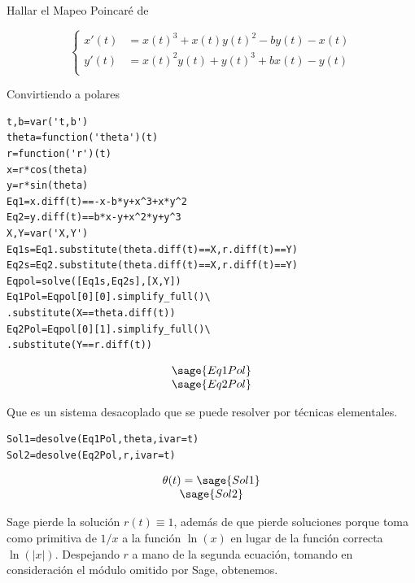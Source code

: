 \begin{ejemplo}{} Hallar el Mapeo Poincaré de

 \[\begin{cases} x'(t)&= x\left(t\right)^{3} + x\left(t\right)
y\left(t\right)^{2} - b y\left(t\right) - x\left(t\right)\\
y'(t) &= x\left(t\right)^{2} y\left(t\right) +
y\left(t\right)^{3} + b x\left(t\right) - y\left(t\right)\\   
  \end{cases}\]


Convirtiendo a polares
\begin{lstlisting}
t,b=var('t,b')
theta=function('theta')(t)
r=function('r')(t)
x=r*cos(theta)
y=r*sin(theta)
Eq1=x.diff(t)==-x-b*y+x^3+x*y^2
Eq2=y.diff(t)==b*x-y+x^2*y+y^3
X,Y=var('X,Y')
Eq1s=Eq1.substitute(theta.diff(t)==X,r.diff(t)==Y)
Eq2s=Eq2.substitute(theta.diff(t)==X,r.diff(t)==Y)
Eqpol=solve([Eq1s,Eq2s],[X,Y])
Eq1Pol=Eqpol[0][0].simplify_full()\
.substitute(X==theta.diff(t))
Eq2Pol=Eqpol[0][1].simplify_full()\
.substitute(Y==r.diff(t))

\end{lstlisting}


\[\begin{array}{c}
   \sage{Eq1Pol}\\
   \sage{Eq2Pol}
  \end{array}
\]


Que es un sistema desacoplado que se puede resolver por técnicas elementales. 
\begin{lstlisting}
Sol1=desolve(Eq1Pol,theta,ivar=t)
Sol2=desolve(Eq2Pol,r,ivar=t)
\end{lstlisting}

\[\begin{array}{c}
   \theta(t)=\sage{Sol1}\\
   \sage{Sol2}
  \end{array}
\]

Sage pierde la solución $r(t)\equiv 1$, además de que pierde soluciones porque toma como primitiva de $1/x$ a la función $\ln(x)$ en lugar de la función correcta $\ln(|x|)$.    Despejando $r$ a mano de la segunda ecuación, tomando en consideración el módulo omitido por Sage, obtenemos.


\end{ejemplo}
